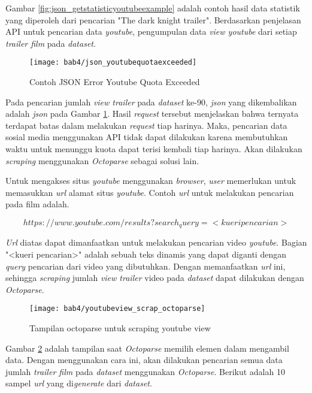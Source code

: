 Gambar \ref{fig:json_getstatisticyoutubeexample} adalah contoh hasil data statistik yang diperoleh dari pencarian "The dark knight trailer".  Berdasarkan penjelasan API untuk pencarian data \textit{youtube}, pengumpulan data \textit{view youtube} dari setiap \textit{trailer film} pada \textit{dataset}. 


\begin{figure}[H]
	\centering  
	\texttt{[image: bab4/json\_youtubequotaexceeded]}   
	\caption{Contoh JSON Error Youtube Quota Exceeded }
	\label{fig:json_youtubequotaexceeded} 
\end{figure} 

Pada pencarian jumlah \textit{view trailer} pada \textit{dataset} ke-90, \textit{json} yang dikembalikan adalah \textit{json} pada Gambar \ref{fig:json_youtubequotaexceeded}. Hasil \textit{request} tersebut menjelaskan bahwa ternyata terdapat batas dalam melakukan \textit{request} tiap harinya. Maka, pencarian data sosial media menggunakan API tidak dapat dilakukan karena membutuhkan waktu untuk menunggu kuota dapat terisi kembali tiap harinya. Akan dilakukan \textit{scraping} menggunakan \textit{Octoparse} sebagai solusi lain. 

Untuk mengakses situs \textit{youtube} menggunakan \textit{browser}, \textit{user} memerlukan untuk memasukkan \textit{url} alamat situs \textit{youtube}. Contoh \textit{url} untuk melakukan pencarian pada film adalah. 


\begin{displaymath}
https://www.youtube.com/results?search_query=<kueri pencarian>
\end{displaymath} 

\textit{Url} diatas dapat dimanfaatkan untuk melakukan pencarian video \textit{youtube}. Bagian "<kueri pencarian>" adalah sebuah teks dinamis yang dapat diganti dengan \textit{query} pencarian dari video yang dibutuhkan. Dengan memanfaatkan \textit{url} ini, sehingga \textit{scraping} jumlah \textit{view trailer} video pada \textit{dataset} dapat dilakukan dengan \textit{Octoparse}. 

\begin{figure}[H]
	\centering  
	\texttt{[image: bab4/youtubeview\_scrap\_octoparse]}   
	\caption{Tampilan octoparse untuk scraping youtube view }
	\label{fig:youtubeview_scrap_octoparse} 
\end{figure} 

Gambar \ref{fig:youtubeview_scrap_octoparse} adalah tampilan saat \textit{Octoparse} memilih elemen dalam mengambil data. Dengan menggunakan cara ini, akan dilakukan pencarian semua data jumlah \textit{trailer film} pada \textit{dataset} menggunakan \textit{Octoparse}. Berikut adalah 10 sampel \textit{url} yang di\textit{generate} dari \textit{dataset}. 


